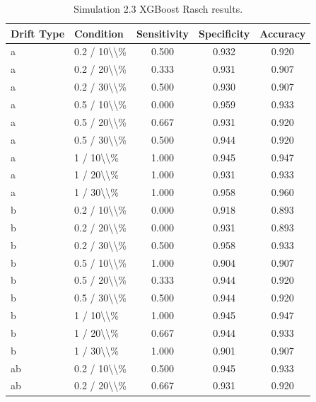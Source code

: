 \begin{table}[!h]
\centering
\caption{\label{tab:tab:sim23_xgb_rasch}Simulation 2.3 XGBoost Rasch results.}
\centering
\begin{tabular}[t]{llccc}
\toprule
Drift Type & Condition & Sensitivity & Specificity & Accuracy\\
\midrule
a & 0.2 / 10\textbackslash{}\textbackslash{}\% & 0.500 & 0.932 & 0.920\\
a & 0.2 / 20\textbackslash{}\textbackslash{}\% & 0.333 & 0.931 & 0.907\\
a & 0.2 / 30\textbackslash{}\textbackslash{}\% & 0.500 & 0.930 & 0.907\\
a & 0.5 / 10\textbackslash{}\textbackslash{}\% & 0.000 & 0.959 & 0.933\\
a & 0.5 / 20\textbackslash{}\textbackslash{}\% & 0.667 & 0.931 & 0.920\\
\addlinespace
a & 0.5 / 30\textbackslash{}\textbackslash{}\% & 0.500 & 0.944 & 0.920\\
a & 1 / 10\textbackslash{}\textbackslash{}\% & 1.000 & 0.945 & 0.947\\
a & 1 / 20\textbackslash{}\textbackslash{}\% & 1.000 & 0.931 & 0.933\\
a & 1 / 30\textbackslash{}\textbackslash{}\% & 1.000 & 0.958 & 0.960\\
b & 0.2 / 10\textbackslash{}\textbackslash{}\% & 0.000 & 0.918 & 0.893\\
\addlinespace
b & 0.2 / 20\textbackslash{}\textbackslash{}\% & 0.000 & 0.931 & 0.893\\
b & 0.2 / 30\textbackslash{}\textbackslash{}\% & 0.500 & 0.958 & 0.933\\
b & 0.5 / 10\textbackslash{}\textbackslash{}\% & 1.000 & 0.904 & 0.907\\
b & 0.5 / 20\textbackslash{}\textbackslash{}\% & 0.333 & 0.944 & 0.920\\
b & 0.5 / 30\textbackslash{}\textbackslash{}\% & 0.500 & 0.944 & 0.920\\
\addlinespace
b & 1 / 10\textbackslash{}\textbackslash{}\% & 1.000 & 0.945 & 0.947\\
b & 1 / 20\textbackslash{}\textbackslash{}\% & 0.667 & 0.944 & 0.933\\
b & 1 / 30\textbackslash{}\textbackslash{}\% & 1.000 & 0.901 & 0.907\\
ab & 0.2 / 10\textbackslash{}\textbackslash{}\% & 0.500 & 0.945 & 0.933\\
ab & 0.2 / 20\textbackslash{}\textbackslash{}\% & 0.667 & 0.931 & 0.920\\

\end{tabular}
\end{table}
